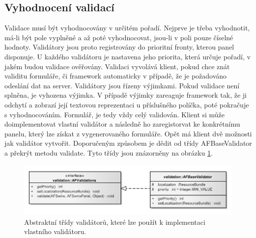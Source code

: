 \subsection{Vyhodnocení validací}
Validace musí být vyhodnocovány v určitém pořadí. Nejprve je třeba vyhodnotit, má-li být pole vyplněné a až poté vyhodnocovat, jsou-li v poli pouze číselné hodnoty. Validátory jsou proto registrovány do prioritní fronty, kterou panel disponuje. U každého validátoru je nastavena jeho priorita, která určuje pořadí, v jakém budou validace ověřovány. Validaci vyvolává klient, pokud chce znát validitu formuláře, či framework automaticky v případě, že je požadováno odeslání dat na server. Validátory jsou řízeny výjimkami. Pokud validace není splněna, je vyhozena výjimka. V případě výjimky zareaguje framework tak, že ji odchytí a zobrazí její textovou reprezentaci u příslušného políčka, poté pokračuje s vyhodnocováním. Formulář, je tedy vždy celý validován. Klient si může doimplementovat vlastní validátor a následně ho zaregistorvat ke konkrétnímu panelu, který lze získat z vygenerovaného formuláře. Opět má klient dvě možnosti jak validátor vytvořit. Doporučeným způsobem je dědit od třídy AFBaseValidator a překrýt metodu validate. Tyto třídy jsou znázorněny na obrázku \ref{img:validationModel}.
\begin{figure}[h!]
\includegraphics{images/validationModel}
\caption{Abstraktní třídy validátorů, které lze použít k implementaci vlastního validátoru.}
\label{img:validationModel}
\end{figure}

